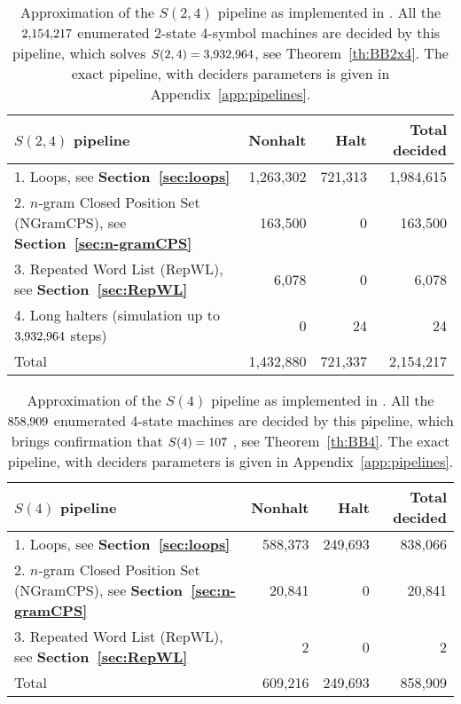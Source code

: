 \begin{table}[h!]
  \centering
  \begin{tabular}{|l|rrr|}
    \hline
    $S(2,4)$ pipeline                                                                    & Nonhalt   & Halt    & Total decided \\
    \hline
    1. Loops, see \textbf{Section~\ref{sec:loops}}                                       & 1,263,302 & 721,313 & 1,984,615     \\
    2. $n$-gram Closed Position Set (NGramCPS), see \textbf{Section~\ref{sec:n-gramCPS}} & 163,500   & 0       & 163,500       \\
    3. Repeated Word List (RepWL), see \textbf{Section~\ref{sec:RepWL}}                  & 6,078     & 0       & 6,078         \\
    4. Long halters (simulation up to $3{,}932{,}964$ steps)                                    & 0         & 24      & 24            \\
    \hline
    Total                                                                                & 1,432,880 & 721,337 & 2,154,217     \\ \hline
  \end{tabular}
  \caption{Approximation of the $S(2,4)$ pipeline as implemented in \CoqBB. All the $2{,}154{,}217$ enumerated 2-state 4-symbol machines are decided by this pipeline, which solves $S(2,4) = 3{,}932{,}964$, see Theorem~\ref{th:BB2x4}. The exact pipeline, with deciders parameters is given in Appendix~\ref{app:pipelines}. }\label{tab:pipelineBB2x4}
\end{table}

\begin{table}[h!]
  \centering
  \begin{tabular}{|l|rrr|}
    \hline
    $S(4)$ pipeline                                                                      & Nonhalt & Halt    & Total decided \\
    \hline
    1. Loops, see \textbf{Section~\ref{sec:loops}}                                       & 588,373 & 249,693 & 838,066       \\
    2. $n$-gram Closed Position Set (NGramCPS), see \textbf{Section~\ref{sec:n-gramCPS}} & 20,841  & 0       & 20,841        \\
    3. Repeated Word List (RepWL), see \textbf{Section~\ref{sec:RepWL}}                  & 2       & 0       & 2             \\
    \hline
    Total                                                                                & 609,216 & 249,693 & 858,909       \\
    \hline
  \end{tabular}
  \caption{Approximation of the $S(4)$ pipeline as implemented in \CoqBB. All the $858{,}909$ enumerated 4-state machines are decided by this pipeline, which brings confirmation that $S(4) = 107$ \cite{Brady83}, see Theorem~\ref{th:BB4}. The exact pipeline, with deciders parameters is given in Appendix~\ref{app:pipelines}. }\label{tab:pipelineBB4}
\end{table}

